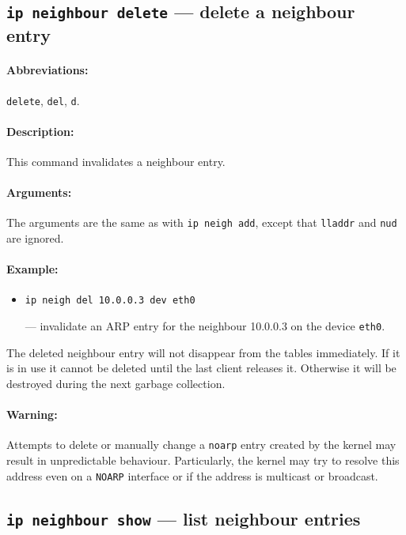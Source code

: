 \subsection{{\tt ip neighbour delete} --- delete a neighbour entry}

\paragraph{Abbreviations:} \verb|delete|, \verb|del|, \verb|d|.

\paragraph{Description:} This command invalidates a neighbour entry.

\paragraph{Arguments:} The arguments are the same as with \verb|ip neigh add|,
except that \verb|lladdr| and \verb|nud| are ignored.


\paragraph{Example:}
\begin{itemize}
\item \verb|ip neigh del 10.0.0.3 dev eth0|

--- invalidate an ARP entry for the neighbour 10.0.0.3 on the device \verb|eth0|.

\end{itemize}

\begin{NB}
 The deleted neighbour entry will not disappear from the tables
 immediately. If it is in use it cannot be deleted until the last
 client releases it. Otherwise it will be destroyed during
 the next garbage collection.
\end{NB}


\paragraph{Warning:} Attempts to delete or manually change
a \verb|noarp| entry created by the kernel may result in unpredictable behaviour.
Particularly, the kernel may try to resolve this address even
on a \verb|NOARP| interface or if the address is multicast or broadcast.


\subsection{{\tt ip neighbour show} --- list neighbour entries}

